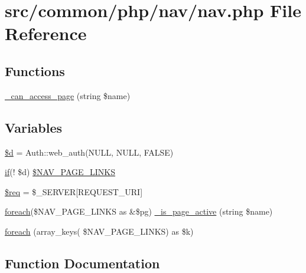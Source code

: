 \hypertarget{nav_8php}{}\section{src/common/php/nav/nav.php File Reference}
\label{nav_8php}
\subsection*{Functions}
\begin{DoxyCompactItemize}
\item 
\hyperlink{nav_8php_a353cf1dec5c85cd85ad53510ae1b64a3}{\+\_\+can\+\_\+access\+\_\+page} (string \$name)
\end{DoxyCompactItemize}
\subsection*{Variables}
\begin{DoxyCompactItemize}
\item 
\hyperlink{nav_8php_a0cf5dd496d9f5ff1edf00d234771dcfe}{\$d} = Auth\+::web\+\_\+auth(N\+U\+LL, N\+U\+LL, F\+A\+L\+SE)
\item 
\hyperlink{login_2index_8php_ab51de40bbba7bda6a6baf15c5564dc16}{if}(! \$d) \hyperlink{nav_8php_a12d2793acfc806c9b1847574dd13bf3d}{\$\+N\+A\+V\+\_\+\+P\+A\+G\+E\+\_\+\+L\+I\+N\+KS}
\item 
\hyperlink{nav_8php_a63a7a283ea5dee8af1e2d5a3435bf370}{\$req} = \$\+\_\+\+S\+E\+R\+V\+ER\mbox{[}\textquotesingle{}R\+E\+Q\+U\+E\+S\+T\+\_\+\+U\+RI\textquotesingle{}\mbox{]}
\item 
\hyperlink{nav_8php_ae1644694b86a7bc439825e2bbeec3d7f}{foreach}(\$N\+A\+V\+\_\+\+P\+A\+G\+E\+\_\+\+L\+I\+N\+KS as \&\$pg) \hyperlink{nav_8php_a66e620e88e442e4f5d0fe4f88c536188}{\+\_\+is\+\_\+page\+\_\+active} (string \$name)
\item 
\hyperlink{nav_8php_ae1644694b86a7bc439825e2bbeec3d7f}{foreach} (array\+\_\+keys( \$N\+A\+V\+\_\+\+P\+A\+G\+E\+\_\+\+L\+I\+N\+KS) as \$k)
\end{DoxyCompactItemize}


\subsection{Function Documentation}
\mbox{\label{nav_8php_a353cf1dec5c85cd85ad53510ae1b64a3}} 
